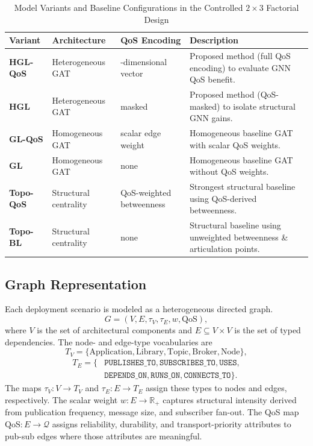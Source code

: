 \documentclass[sigconf,9pt,anonymous]{acmart}
\begin{document}
\begin{table}[t]
\centering
\caption{Model Variants and Baseline Configurations in the Controlled $2\times3$ Factorial Design}
\label{tab:variants}
\small
\begin{tabularx}{\textwidth}{>{\raggedright\arraybackslash}p{} >{\raggedright\arraybackslash}p{} >{\raggedright\arraybackslash}p{} >{\raggedright\arraybackslash}p{}}
\toprule
\textbf{Variant} & \textbf{Architecture} & \textbf{QoS Encoding} & \textbf{Description} \\
\midrule
\textbf{HGL-QoS} & Heterogeneous GAT & 7-dimensional vector & Proposed method (full QoS encoding) to evaluate GNN QoS benefit. \\
\textbf{HGL} & Heterogeneous GAT & masked & Proposed method (QoS-masked) to isolate structural GNN gains. \\
\textbf{GL-QoS} & Homogeneous GAT & scalar edge weight & Homogeneous baseline GAT with scalar QoS weights. \\
\textbf{GL} & Homogeneous GAT & none & Homogeneous baseline GAT without QoS weights. \\
\textbf{Topo-QoS} & Structural centrality & QoS-weighted betweenness & Strongest structural baseline using QoS-derived betweenness. \\
\textbf{Topo-BL} & Structural centrality & none & Structural baseline using unweighted betweenness \& articulation points. \\
\bottomrule
\end{tabularx}
\end{table}

\subsection{Graph Representation}

Each deployment scenario is modeled as a heterogeneous directed graph.
\[
G = (V, E, \tau_V, \tau_E, w, \mathrm{QoS}),
\]
where $V$ is the set of architectural components and $E \subseteq V \times V$ is the set of typed dependencies. The node- and edge-type vocabularies are
\[
T_V=\{\text{Application}, \text{Library}, \text{Topic}, \text{Broker}, \text{Node}\},
\]
\[
\begin{split}
T_E=\{&\texttt{PUBLISHES\_TO}, \texttt{SUBSCRIBES\_TO}, \texttt{USES},\\
&\texttt{DEPENDS\_ON}, \texttt{RUNS\_ON}, \texttt{CONNECTS\_TO}\}.
\end{split}
\]
The maps $\tau_V : V \to T_V$ and $\tau_E : E \to T_E$ assign these types to nodes and edges, respectively. The scalar weight $w:E\to\mathbb{R}_+$ captures structural intensity derived from publication frequency, message size, and subscriber fan-out. The QoS map $\mathrm{QoS}:E\to\mathcal{Q}$ assigns reliability, durability, and transport-priority attributes to pub-sub edges where those attributes are meaningful.
\end{document}
